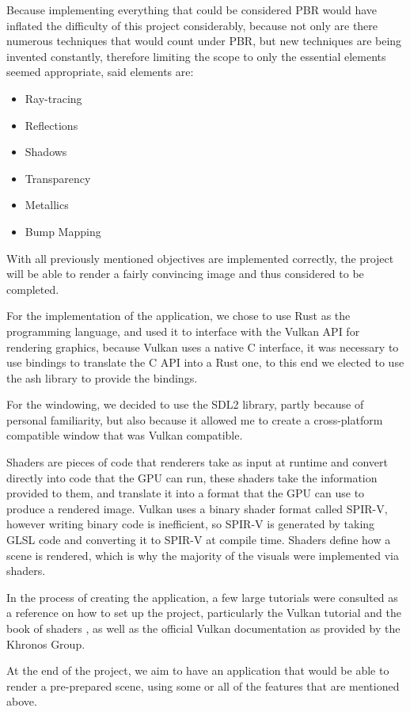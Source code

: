 \documentclass[../report.tex]{subfiles}
\begin{document}
Because implementing everything that could be considered PBR would have inflated the difficulty of this project considerably, because not only are there 
numerous techniques that would count under PBR, but new techniques are being invented constantly, therefore limiting the scope to only the essential elements 
seemed appropriate, said elements are:
\begin{itemize}
    \item Ray-tracing
    \item Reflections
    \item Shadows
    \item Transparency
    \item Metallics
    \item Bump Mapping
\end{itemize}
With all previously mentioned objectives are implemented correctly, the project will be able to render a fairly convincing image and thus considered to be completed.

For the implementation of the application, we chose to use Rust as the programming language, and used it to interface with the Vulkan API
for rendering graphics, because Vulkan uses a native C interface, it was necessary to use bindings to translate the C API into a Rust one, to this end we elected to use the ash library to provide the bindings.

For the windowing, we decided to use the SDL2 library, partly because of personal familiarity, but also because it allowed me to create a 
cross-platform compatible window that was Vulkan compatible.

Shaders are pieces of code that renderers take as input at runtime and convert directly into code that the GPU can run, these shaders take the information provided to them, and translate it into a format that the GPU can use to produce a rendered image. Vulkan uses a binary shader format called SPIR-V, however writing binary code is inefficient, so SPIR-V is generated by taking GLSL code and converting it to SPIR-V at compile time.
Shaders define how a scene is rendered, which is why the majority of the visuals were implemented via shaders.

In the process of creating the application, a few large tutorials were consulted as a reference on how to set up the project, particularly the Vulkan tutorial  and the book of shaders , as well as the official Vulkan documentation as provided by the Khronos Group.

At the end of the project, we aim to have an application that would be able to render a pre-prepared scene, using some or all of the features that are mentioned above.
\end{document}
